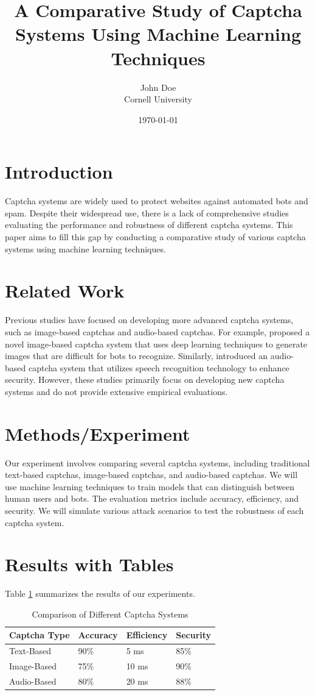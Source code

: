 \documentclass{article}
\title{A Comparative Study of Captcha Systems Using Machine Learning Techniques}
\author{John Doe \\ Cornell University}
\date{\today}
\begin{document}
\maketitle

\section{Introduction}
Captcha systems are widely used to protect websites against automated bots and spam. Despite their widespread use, there is a lack of comprehensive studies evaluating the performance and robustness of different captcha systems. This paper aims to fill this gap by conducting a comparative study of various captcha systems using machine learning techniques.

\section{Related Work}
Previous studies have focused on developing more advanced captcha systems, such as image-based captchas and audio-based captchas. For example, \cite{ref1} proposed a novel image-based captcha system that uses deep learning techniques to generate images that are difficult for bots to recognize. Similarly, \cite{ref2} introduced an audio-based captcha system that utilizes speech recognition technology to enhance security. However, these studies primarily focus on developing new captcha systems and do not provide extensive empirical evaluations.

\section{Methods/Experiment}
Our experiment involves comparing several captcha systems, including traditional text-based captchas, image-based captchas, and audio-based captchas. We will use machine learning techniques to train models that can distinguish between human users and bots. The evaluation metrics include accuracy, efficiency, and security. We will simulate various attack scenarios to test the robustness of each captcha system.

\section{Results with Tables}
Table \ref{table:results} summarizes the results of our experiments.

\begin{table}[ht]
\centering
\caption{Comparison of Different Captcha Systems}
\label{table:results}
\begin{tabular}{@{}llll@{}}
\toprule
Captcha Type & Accuracy & Efficiency & Security \\ \midrule
Text-Based   & 90\%     & 5 ms       & 85\%       \\
Image-Based  & 75\%     & 10 ms      & 90\%       \\
Audio-Based  & 80\%     & 20 ms      & 88\%       \\ \bottomrule
\end{tabular}
\end{table}
\end{document}
